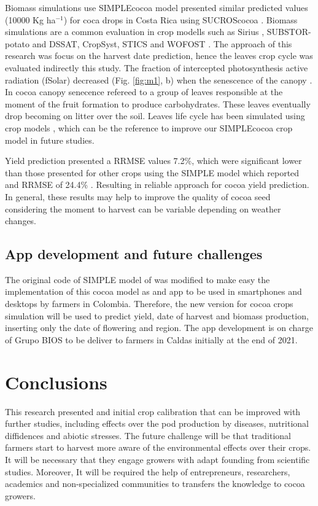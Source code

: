 \documentclass[gene,journal,article,submit,moreauthors,pdftex]{Definitions/mdpi}
\begin{document}
 
Biomass simulations use SIMPLEcocoa model presented similar predicted values (10000 Kg ha$^{-1}$) for coca drops in Costa Rica using SUCROScocoa \citep{zuidema2005}. Biomass simulations are a common evaluation in crop modells such as Sirius \citep{Crout20142}, SUBSTOR-potato \citep{Raymundo2017} and  DSSAT, CropSyst, STICS and WOFOST \citep{Confalonieri2016}. The approach of this research was focus  on the harvest date prediction, hence the leaves crop cycle was evaluated indirectly this study. The fraction of intercepted photosynthesis active radiation (fSolar) decreased (Fig. \ref{fig:m1}, b) when the senescence of the canopy \citep{zuidema2005}. In cocoa canopy senecence  refereed to  a group of leaves responsible  at the moment of the fruit formation to produce carbohydrates. These leaves eventually drop becoming on litter over the soil. Leaves life cycle has been simulated using crop models \citep{Crout2010, zuidema2005}, which can be the reference to improve our SIMPLEcocoa crop model in future studies.   

Yield prediction presented a RRMSE values 7.2\%, which were significant lower than those  presented for other crops using the SIMPLE model which reported and RRMSE of 24.4\% \citep{Zao2019simple}. Resulting in reliable approach for cocoa yield prediction. In general, these results may help to improve the quality of cocoa seed considering the moment to harvest can be variable depending on weather changes.  


\subsection{App development and future challenges }
The original code of SIMPLE model of \citep{Zao2019simple} was modified to make easy the implementation of this cocoa model as and app to be used in smartphones and desktops by farmers in Colombia. Therefore, the new version for cocoa crops simulation will be used to predict yield, date of harvest and biomass production, inserting only the date of flowering and region. The app development is on charge of Grupo BIOS to be deliver to farmers in Caldas initially at the end of 2021. 

\section{Conclusions}
This research presented and initial crop calibration that can be improved with further studies, including effects over the pod production by diseases, nutritional diffidences and abiotic stresses. The future challenge will be that traditional farmers start to harvest more aware of the environmental effects over their crops. It will be necessary that they engage growers with adapt founding from scientific studies. Moreover, It will be required the help of entrepreneurs, researchers, academics and non-specialized communities to transfers the knowledge to cocoa growers.
\end{document}
